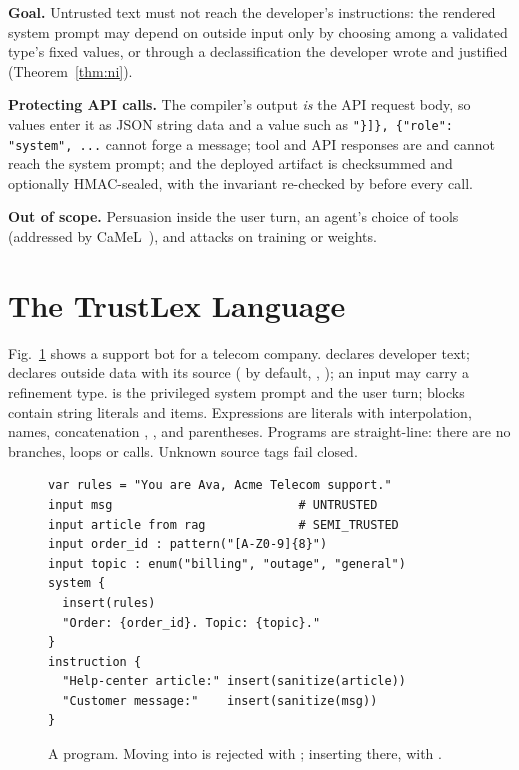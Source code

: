 \documentclass[conference]{IEEEtran}
\begin{document}
\textbf{Goal.} Untrusted text must not reach the developer's instructions: the rendered system prompt may depend on outside input only by choosing among a validated type's fixed values, or through a declassification the developer wrote and justified (Theorem~\ref{thm:ni}).

\textbf{Protecting API calls.} The compiler's output \emph{is} the API request body, so values enter it as JSON string data and a value such as \verb|"}]}, {"role": "system", ...| cannot forge a message; tool and API responses are  and cannot reach the system prompt; and the deployed artifact is checksummed and optionally HMAC-sealed, with the invariant re-checked by  before every call.

\textbf{Out of scope.} Persuasion inside the user turn, an agent's choice of tools (addressed by CaMeL~\cite{debenedetti2025camel}), and attacks on training or weights.

\section{The TrustLex Language}

Fig.~\ref{lst:example} shows a support bot for a telecom company.  declares developer text;  declares outside data with its source ( by default, , ); an input may carry a refinement type.  is the privileged system prompt and  the user turn; blocks contain string literals and  items. Expressions are literals with  interpolation, names, concatenation \code{+}, ,  and parentheses. Programs are straight-line: there are no branches, loops or calls. Unknown source tags fail closed.

\begin{figure}[t]
\begin{lstlisting}
var rules = "You are Ava, Acme Telecom support."
input msg                          # UNTRUSTED
input article from rag             # SEMI_TRUSTED
input order_id : pattern("[A-Z0-9]{8}")
input topic : enum("billing", "outage", "general")
system {
  insert(rules)
  "Order: {order_id}. Topic: {topic}."
}
instruction {
  "Help-center article:" insert(sanitize(article))
  "Customer message:"    insert(sanitize(msg))
}
\end{lstlisting}
\caption{A \TL{} program. Moving  into  is rejected with ; inserting  there, with .}
\label{lst:example}
\end{figure}
\end{document}
